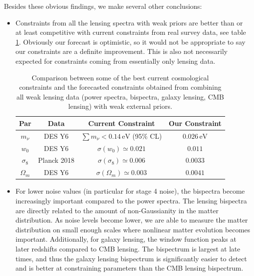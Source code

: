 \documentclass[11pt]{article} %
\begin{document}
Besides these obvious findings, we make several other conclusions:
\begin{itemize}
    \item Constraints from all the lensing spectra with weak priors are better than or at least competitive with current constraints from real survey data, see table \ref{tab:currenttoforecastcompare}. Obviously our forecast is optimistic, so it would not be appropriate to say our constraints are a definite improvement. This is also not necessarily expected for constraints coming from essentially only lensing data.
    
    \begin{table}[]
        \centering
        \begin{tabular}{|c|c|c|c|}
            \hline
            Par & Data & Current Constraint & Our Constraint \\
            \hline
            $m_\nu$ & DES Y6 \cite{descollaboration2026darkenergysurveyyear} & $\sum m_\nu < 0.14\,\mathrm{eV}$ (95\% CL) & $0.026\,\mathrm{eV}$ \\
            $w_0$ & DES Y6 \cite{descollaboration2026darkenergysurveyyear}& $\sigma(w_0)\simeq 0.021$ & $0.011$ \\
            $\sigma_8$ & Planck 2018 \cite{planckresults}& $\sigma(\sigma_8)\simeq 0.006$ & $0.0033$ \\
            $\Omega_m$ & DES Y6 \cite{descollaboration2026darkenergysurveyyear}& $\sigma(\Omega_m)\simeq 0.003$ & $0.0041$ \\
            \hline
        \end{tabular}
        \caption{Comparison between some of the best current cosmological constraints and the forecasted constraints obtained from combining all weak lensing data (power spectra, bispectra, galaxy lensing, CMB lensing) with weak external priors.}
        \label{tab:currenttoforecastcompare}
    \end{table}

    \item For lower noise values (in particular for stage 4 noise), the bispectra become increasingly important compared to the power spectra. The lensing bispectra are directly related to the amount of non-Gaussianity in the matter distribution. As noise levels become lower, we are able to measure the matter distribution on small enough scales where nonlinear matter evolution becomes important. Additionally, for galaxy lensing, the window function peaks at later redshifts compared to CMB lensing. The bispectrum is largest at late times, and thus the galaxy lensing bispectrum is significantly easier to detect and is better at constraining parameters than the CMB lensing bispectrum.


\end{itemize}
\end{document}
